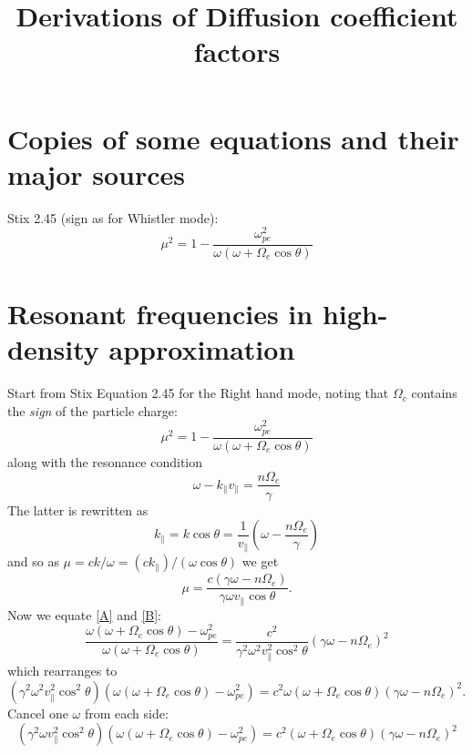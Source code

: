 \documentclass[]{article}
\title{Derivations of Diffusion coefficient factors}
\begin{document}
\tableofcontents

\section{Copies of some equations and their major sources}
Stix 2.45 (sign as for Whistler mode):
\begin{equation}
\mu^2 =  1 - \frac {\omega_{pe}^2}{\omega(\omega + \Omega_e \cos\theta)}
\end{equation}



\section{Resonant frequencies in high-density approximation}
Start from Stix Equation 2.45 for the Right hand mode, noting that $\Omega_c$ contains the \emph{sign} of the particle charge:
\begin{equation}\label{A}
\mu^2 =  1 - \frac {\omega_{pe}^2}{\omega(\omega + \Omega_e \cos\theta)}
\end{equation}
along with the resonance condition
\begin{equation}
\omega -k_\parallel v_\parallel = \frac{n \Omega_e}{\gamma}
\end{equation}
The latter is rewritten as
\begin{equation}
k_\parallel = k \cos\theta = \frac{1}{v_\parallel} \left(\omega - \frac{n \Omega_e}{\gamma} \right) \end{equation}
and so as $ \mu = c k /\omega = (c k_\parallel)/( \omega \cos\theta)$ we get
\begin{equation}\label{B}
\mu = \frac{c ( \gamma \omega - n \Omega_e)}{\gamma\omega v_\parallel \cos\theta}.
\end{equation}
Now we equate \ref{A} and \ref{B}:
\begin{equation}
\frac{\omega(\omega + \Omega_e \cos\theta) - \omega_{pe}^2}{\omega(\omega + \Omega_e \cos\theta)} = \frac{c^2}{\gamma^2 \omega^2 v_\parallel^2 \cos^2\theta} (\gamma \omega - n \Omega_e)^2 \end{equation}
which rearranges to
\begin{equation}
(\gamma^2 \omega^2 v_\parallel^2 \cos^2\theta) (\omega(\omega + \Omega_e \cos\theta) - \omega_{pe}^2) = c^2 \omega(\omega + \Omega_e \cos\theta)(\gamma \omega - n \Omega_e)^2. \end{equation}
Cancel one $\omega$ from each side:
\begin{equation}
(\gamma^2 \omega v_\parallel^2 \cos^2\theta) (\omega(\omega + \Omega_e \cos\theta) - \omega_{pe}^2) = c^2 (\omega + \Omega_e \cos\theta)(\gamma \omega - n \Omega_e)^2 \end{equation}
\end{document}
